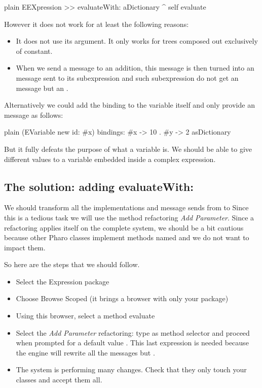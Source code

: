 \documentclass[10pt,twoside,english]{_support/latex/sbabook/sbabook}
\begin{document}
\begin{displaycode}{plain}
EEXpression >> evaluateWith: aDictionary
	^ self evaluate
\end{displaycode}

However it does not work for at least the following reasons: 

\begin{itemize}
\item It does not use its argument. It only works for trees composed out exclusively of constant. 
\item When we send a message  to an addition, this message is then turned into an  message sent to its subexpression and such subexpression do not get an  message but an .
\end{itemize}

Alternatively we could add the binding to the variable itself and only provide an  message as follows: 

\begin{displaycode}{plain}
(EVariable new id: #x) bindings: { #x -> 10 . #y -> 2 } asDictionary
\end{displaycode}

 But it fully defeats the purpose of what a variable is. We should be able to give different values to a variable embedded inside a complex expression.
\subsection{The solution: adding evaluateWith:}
We should transform all the implementations and message sends from  to  Since this is a tedious task we will use the method refactoring \textit{Add Parameter}.
Since a refactoring applies itself on the complete system, we should be a bit cautious because other Pharo classes implement methods named  and we do not want to impact them. 

So here are the steps that we should follow.

\begin{itemize}
\item Select the Expression package
\item Choose Browse Scoped (it brings a browser with only your package)
\item Using this browser, select a method evaluate
\item Select the \textit{Add Parameter} refactoring: type  as method selector and proceed when prompted for a default value . This last expression is needed because the engine will rewrite all the messages  but .
\item The system is performing many changes. Check that they only touch your classes and accept them all. 
\end{itemize}
\end{document}
